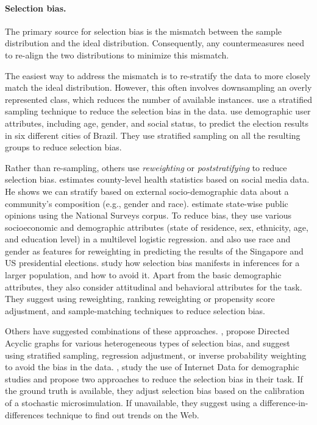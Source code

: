 \documentclass[11pt,a4paper]{article}
\begin{document}
\paragraph{Selection bias.}
The primary source for selection bias is the mismatch between the sample distribution and the ideal distribution. Consequently, any countermeasures need to re-align the two distributions to minimize this mismatch.

The easiest way to address the mismatch is to re-stratify the data to more closely match the ideal distribution. However, this often involves downsampling an overly represented class, which reduces the number of available instances.
 use a stratified sampling technique to reduce the selection bias in the data. 
 use demographic user attributes, including age, gender, and social status, to predict the election results in six different cities of Brazil. They use stratified sampling on all the resulting groups to reduce selection bias. 

Rather than re-sampling, others use \textit{reweighting} or \textit{poststratifying} to reduce selection bias.
 estimates county-level health statistics based on social media data.
He shows we can stratify based on external socio-demographic data about a community's composition (e.g., gender and race).
 estimate state-wise public opinions using the National Surveys corpus. To reduce bias, they use various socioeconomic and demographic attributes (state of residence, sex, ethnicity, age, and education level) in a multilevel logistic regression. 
 and  also use race and gender as features for reweighting in predicting the results of the Singapore and US presidential elections. 
 study how selection bias manifests in inferences for a larger population, and how to avoid it. Apart from the basic demographic attributes, they also consider attitudinal and behavioral attributes for the task.
They suggest using reweighting, ranking reweighting or propensity score adjustment, and sample-matching techniques to reduce selection bias.

Others have suggested combinations of these approaches. 
, propose Directed Acyclic graphs for various heterogeneous types of selection bias, and suggest using stratified sampling, regression adjustment, or inverse probability weighting to avoid the bias in the data. 
, study the use of Internet Data for demographic studies and propose two approaches to reduce the selection bias in their task. If the ground truth is available, they adjust selection bias based on the calibration of a stochastic microsimulation. If unavailable, they suggest using a difference-in-differences technique to find out trends on the Web.
\end{document}
